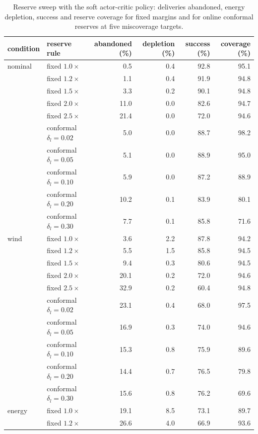 \begin{table}[tb]
\centering
\caption{Reserve sweep with the soft actor-critic policy: deliveries abandoned, energy depletion, success and reserve coverage for fixed margins and for online conformal reserves at five miscoverage targets.}
\label{tab:par}
\small
\begin{tabular}{llrrrr}
\toprule
condition & reserve rule & abandoned (\%) & depletion (\%) & success (\%) & coverage (\%) \\
\midrule
nominal & fixed $1.0\times$ & 0.5 & 0.4 & 92.8 & 95.1 \\
 & fixed $1.2\times$ & 1.1 & 0.4 & 91.9 & 94.8 \\
 & fixed $1.5\times$ & 3.3 & 0.2 & 90.1 & 94.8 \\
 & fixed $2.0\times$ & 11.0 & 0.0 & 82.6 & 94.7 \\
 & fixed $2.5\times$ & 21.4 & 0.0 & 72.0 & 94.6 \\
 & conformal $\delta_l=0.02$ & 5.0 & 0.0 & 88.7 & 98.2 \\
 & conformal $\delta_l=0.05$ & 5.1 & 0.0 & 88.9 & 95.0 \\
 & conformal $\delta_l=0.10$ & 5.9 & 0.0 & 87.2 & 88.9 \\
 & conformal $\delta_l=0.20$ & 10.2 & 0.1 & 83.9 & 80.1 \\
 & conformal $\delta_l=0.30$ & 7.7 & 0.1 & 85.8 & 71.6 \\
\addlinespace[2pt]
wind & fixed $1.0\times$ & 3.6 & 2.2 & 87.8 & 94.2 \\
 & fixed $1.2\times$ & 5.5 & 1.5 & 85.8 & 94.5 \\
 & fixed $1.5\times$ & 9.4 & 0.3 & 80.6 & 94.5 \\
 & fixed $2.0\times$ & 20.1 & 0.2 & 72.0 & 94.6 \\
 & fixed $2.5\times$ & 32.9 & 0.2 & 60.4 & 94.8 \\
 & conformal $\delta_l=0.02$ & 23.1 & 0.4 & 68.0 & 97.5 \\
 & conformal $\delta_l=0.05$ & 16.9 & 0.3 & 74.0 & 94.6 \\
 & conformal $\delta_l=0.10$ & 15.3 & 0.8 & 75.9 & 89.6 \\
 & conformal $\delta_l=0.20$ & 14.4 & 0.7 & 76.5 & 79.8 \\
 & conformal $\delta_l=0.30$ & 15.6 & 0.8 & 76.2 & 69.6 \\
\addlinespace[2pt]
energy & fixed $1.0\times$ & 19.1 & 8.5 & 73.1 & 89.7 \\
 & fixed $1.2\times$ & 26.6 & 4.0 & 66.9 & 93.6 \\

\end{tabular}
\end{table}
